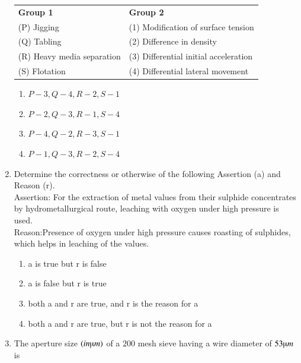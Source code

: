 \documentclass[journal]{IEEEtran}
\theoremstyle{remark}
\begin{document}
\begin{enumerate}
\begin{center}
\begin{tabular}{ll}
\textbf{Group 1 }& \textbf{Group 2} \\
 (P) Jigging      &  (1) Modification of surface tension \\
  (Q) Tabling    & (2) Difference in density\\
 (R) Heavy media separation & (3) Differential initial acceleration  \\
 (S) Flotation & (4) Differential lateral movement \\
\end{tabular}
\end{center}
\begin{multicols}{2}
\begin{enumerate}
\item   $P-3, Q-4, R-2, S-1$
\item  $P-2, Q-3, R-1, S-4$ 
\item   $P-4, Q-2, R-3, S-1$ 
\item   $P-1, Q-3, R-2, S-4$
\end{enumerate}
\end{multicols}

\item  Determine the correctness or otherwise of the following Assertion (a) and Reason (r). \hfill{}\\
Assertion: For the extraction of metal values from their sulphide concentrates by
hydrometallurgical route, leaching with oxygen under high pressure is used. \\
Reason:Presence of oxygen under high pressure causes roasting of sulphides, which helps in leaching of the values. \\


\begin{enumerate}
\item  a is true but r is false
\item  a is false but r is true
\item  both a and r are true, and r is the reason for a
\item  both a and r are true, but r is not the reason for a
\end{enumerate}

\item The aperture size $(in \micro m)$ of a $200$ mesh sieve having a wire diameter of $53 \micro m$ is \underline {\hspace{2cm}} \hfill{}\\



\end{enumerate}
\end{document}
